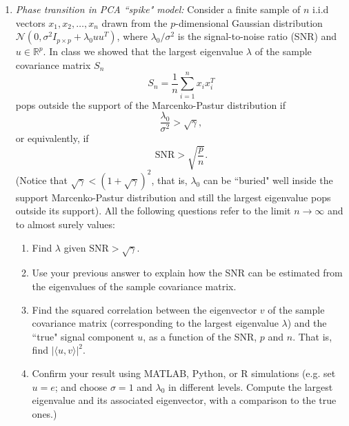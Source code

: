 \documentclass[11pt]{article}
\def\E{{\mathbb E}}
\begin{document}
\begin{enumerate}
%			
%
%


\item {\em Phase transition in PCA ``spike" model:} Consider a finite sample of $n$ i.i.d vectors $x_1,x_2,\ldots,x_n$ drawn from the $p$-dimensional Gaussian distribution $\mathcal{N}(0,\sigma^2 I_{p\times p} + \lambda_0 uu^T)$, where $\lambda_0/\sigma^2$ is the signal-to-noise ratio (SNR) and $u \in \mathbb{R}^p$. In class we showed that the largest eigenvalue $\lambda$ of the sample covariance matrix $S_n$
    $$S_n = \frac{1}{n} \sum_{i=1}^n x_i x_i^T$$
    pops outside the support of the Marcenko-Pastur distribution if $$\frac{\lambda_0}{\sigma^2} > \sqrt{\gamma},$$ or equivalently, if $$\text{SNR} > \sqrt{\frac{p}{n}}.$$ (Notice that $\sqrt{\gamma} < (1+\sqrt{\gamma})^2$, that is, $\lambda_0$ can be ``buried" well inside the support Marcenko-Pastur distribution and still the largest eigenvalue pops outside its support). All the following questions refer to the limit $n\to \infty$ and to almost surely values:

\begin{enumerate}
\item Find $\lambda$ given $\text{SNR} > \sqrt{\gamma}$.
\item Use your previous answer to explain how the SNR can be estimated from the eigenvalues of the sample covariance matrix.
\item Find the squared correlation between the eigenvector $v$ of the sample covariance matrix (corresponding to the largest eigenvalue $\lambda$) and the ``true" signal component $u$, as a function of the SNR, $p$ and $n$. That is, find $|\langle u,v \rangle|^2$. 
\item Confirm your result using MATLAB, Python, or R simulations (e.g. set $u = e$; and choose $\sigma=1$ and $\lambda_0$ in different levels. Compute the largest eigenvalue and its associated eigenvector, with a comparison to the true ones.)
\end{enumerate}


\end{enumerate}
\end{document}
